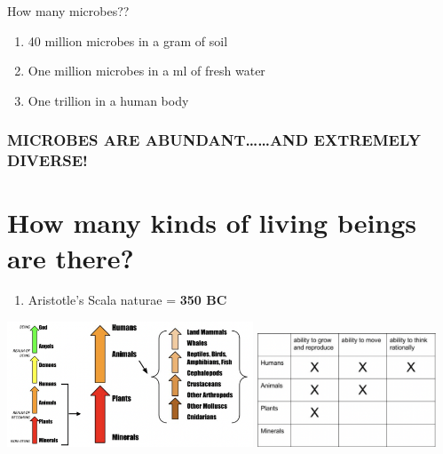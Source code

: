 \documentclass[
]{book}
\providecommand{\tightlist}{%
  \setlength{\itemsep}{0pt}\setlength{\parskip}{0pt}}
\begin{document}
How many microbes??

\begin{enumerate}
\def\labelenumi{\arabic{enumi}.}
\tightlist
\item
  40 million microbes in a gram of soil
\item
  One million microbes in a ml of fresh water
\item
  One trillion in a human body
\end{enumerate}

\hypertarget{microbes-are-abundantand-extremely-diverse}{%
\subsubsection*{MICROBES ARE ABUNDANT\ldots\ldots AND EXTREMELY DIVERSE!}\label{microbes-are-abundantand-extremely-diverse}}

\hypertarget{how-many-kinds-of-living-beings-are-there}{%
\section{How many kinds of living beings are there?}\label{how-many-kinds-of-living-beings-are-there}}

\begin{enumerate}
\def\labelenumi{\arabic{enumi}.}
\tightlist
\item
  Aristotle's Scala naturae
  = \textbf{350 BC}
\end{enumerate}

\includegraphics[width=0.55\textwidth,height=\textheight]{./Figures/Scala1.png}
\includegraphics[width=0.4\textwidth,height=\textheight]{./Figures/Scala2.png}
\end{document}
